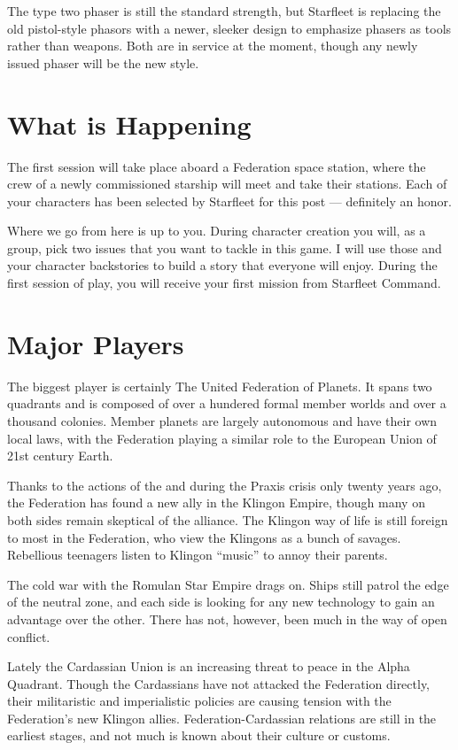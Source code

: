 \documentclass[12pt]{article}
\begin{document}
The type two phaser is still the standard strength, but Starfleet is
replacing the old pistol-style phasors with a newer, sleeker design to
emphasize phasers as tools rather than weapons. Both are in service at the
moment, though any newly issued phaser will be the new style.

\section{What is Happening}
The first session will take place aboard a Federation space station, where the
crew of a newly commissioned  starship will meet and take
their stations. Each of your characters has been selected by Starfleet for this
post --- definitely an honor.

Where we go from here is up to you. During character creation you will, as a
group, pick two issues that you want to tackle in this game. I will use those
and your character backstories to build a story that everyone will enjoy.
During the first session of play, you will receive your first mission from
Starfleet Command.

\section{Major Players}
The biggest player is certainly The United Federation of Planets. It spans two
quadrants and is composed of over a hundered formal member worlds and over a
thousand colonies. Member planets are largely autonomous and have their own
local laws, with the Federation playing a similar role to the European Union of
21st century Earth.

Thanks to the actions of the  and 
during the Praxis crisis only twenty years ago, the Federation has found a new
ally in the Klingon Empire, though many on both sides remain skeptical of the
alliance. The Klingon way of life is still foreign to most in the Federation,
who view the Klingons as a bunch of savages. Rebellious teenagers listen to
Klingon ``music'' to annoy their parents.

The cold war with the Romulan Star Empire drags on. Ships still patrol the edge
of the neutral zone, and each side is looking for any new technology to gain an
advantage over the other. There has not, however, been much in the way of open
conflict.

Lately the Cardassian Union is an increasing threat to peace in the Alpha
Quadrant. Though the Cardassians have not attacked the Federation directly,
their militaristic and imperialistic policies are causing tension with the
Federation's new Klingon allies. Federation-Cardassian relations are still in
the earliest stages, and not much is known about their culture or customs.
\end{document}
